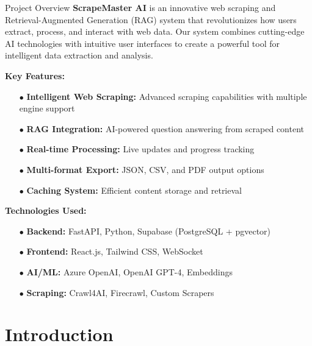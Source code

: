 \documentclass[12pt,a4paper]{report}
\begin{document}
\begin{infobox}{Project Overview}
\textbf{ScrapeMaster AI} is an innovative web scraping and Retrieval-Augmented Generation (RAG) system that revolutionizes how users extract, process, and interact with web data. Our system combines cutting-edge AI technologies with intuitive user interfaces to create a powerful tool for intelligent data extraction and analysis.
\end{infobox}

\vspace{1cm}

\textbf{Key Features:}
\begin{itemize}[leftmargin=2cm]
    \item[\textcolor{secondarygreen}{$\bullet$}] \textbf{Intelligent Web Scraping:} Advanced scraping capabilities with multiple engine support
    \item[\textcolor{secondarygreen}{$\bullet$}] \textbf{RAG Integration:} AI-powered question answering from scraped content
    \item[\textcolor{secondarygreen}{$\bullet$}] \textbf{Real-time Processing:} Live updates and progress tracking
    \item[\textcolor{secondarygreen}{$\bullet$}] \textbf{Multi-format Export:} JSON, CSV, and PDF output options
    \item[\textcolor{secondarygreen}{$\bullet$}] \textbf{Caching System:} Efficient content storage and retrieval
\end{itemize}

\vspace{1cm}

\textbf{Technologies Used:}
\begin{itemize}[leftmargin=2cm]
    \item[\textcolor{primaryblue}{$\bullet$}] \textbf{Backend:} FastAPI, Python, Supabase (PostgreSQL + pgvector)
    \item[\textcolor{primaryblue}{$\bullet$}] \textbf{Frontend:} React.js, Tailwind CSS, WebSocket
    \item[\textcolor{primaryblue}{$\bullet$}] \textbf{AI/ML:} Azure OpenAI, OpenAI GPT-4, Embeddings
    \item[\textcolor{primaryblue}{$\bullet$}] \textbf{Scraping:} Crawl4AI, Firecrawl, Custom Scrapers
\end{itemize}

\chapter{Introduction}
\end{document}
